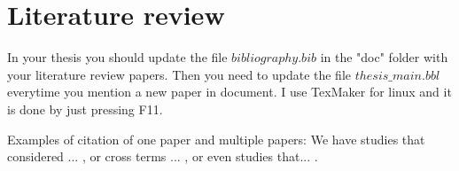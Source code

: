 \chapter{Literature review} \label{chap:lit}


In your thesis you should update the file $bibliography.bib$ in the "doc" folder with your literature review papers.
Then you need to update the file $thesis\_main.bbl$ everytime you mention a new paper in document.
I use TexMaker for linux and it is done by just pressing F11.

Examples of citation of one paper and multiple papers: We have studies that considered ... \cite{lim}, or cross terms ... \cite{luo}, or even studies that... \cite{liu,li2003,zhu2005}.
